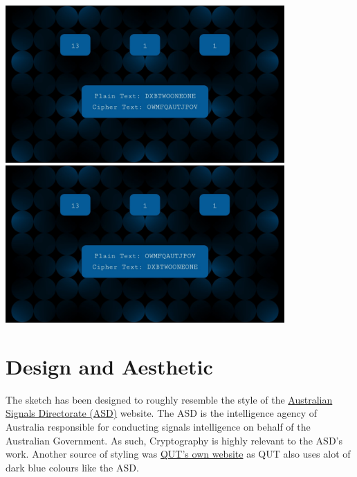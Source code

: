 \documentclass[12pt,a4paper]{article}
\begin{document}
		\begin{center}
			\includegraphics[width=0.8\textwidth]{figures/figure1.jpg}\\
			\vspace{0.5cm}
			\includegraphics[width=0.8\textwidth]{figures/figure2.jpg}\\
		\end{center}
	
	\newpage

	\section{Design and Aesthetic}
		The sketch has been designed to roughly resemble the style of the 
		\href{https://www.asd.gov.au/}{Australian Signals Directorate (ASD)} website. 
		The ASD is the intelligence agency of Australia responsible for conducting 
		signals intelligence on behalf of the Australian Government. As such, 
		Cryptography is highly relevant to the ASD's work. Another source of styling was 
		\href{https://www.qut.edu.au/study/information-technology?undergraduate}{QUT's own website} 
		as QUT also uses alot of dark blue colours like the ASD.\\
		
\end{document}
